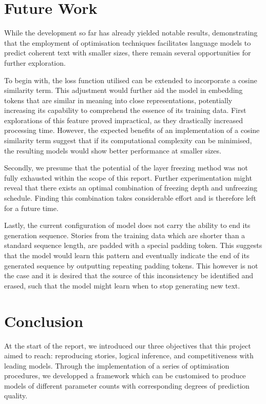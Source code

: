 \documentclass[11pt]{article}
\begin{document}
    \section{Future Work}
    While the development so far has already yielded notable results, demonstrating that the employment of optimisation techniques facilitates language models to predict coherent text with smaller sizes, there remain several opportunities for further exploration.

    To begin with, the loss function utilised can be extended to incorporate a cosine similarity term.
    This adjustment would further aid the model in embedding tokens that are similar in meaning into close representations, potentially increasing its capability to comprehend the essence of its training data.
    First explorations of this feature proved impractical, as they drastically increased processing time.
    However, the expected benefits of an implementation of a cosine similarity term suggest that if its computational complexity can be minimised, the resulting models would show better performance at smaller sizes.

    Secondly, we presume that the potential of the layer freezing method was not fully exhausted within the scope of this report.
    Further experimentation might reveal that there exists an optimal combination of freezing depth and unfreezing schedule.
    Finding this combination takes considerable effort and is therefore left for a future time.

    Lastly, the current configuration of model does not carry the ability to end its generation sequence.
    Stories from the training data which are shorter than a standard sequence length, are padded with a special padding token.
    This suggests that the model would learn this pattern and eventually indicate the end of its generated sequence by outputting repeating padding tokens.
    This however is not the case and it is desired that the source of this inconsistency be identified and erased, such that the model might learn when to stop generating new text.

    \section{Conclusion}
    At the start of the report, we introduced our three objectives that this project aimed to reach: reproducing stories, logical inference, and competitiveness with leading models.
    Through the implementation of a series of optimisation procedures, we developped a framework which can be customised to produce models of different parameter counts with corresponding degrees of prediction quality.
\end{document}

